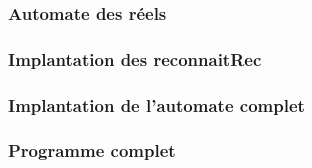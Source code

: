 \documentclass[./standalone.tex]{subfiles}
\begin{document}
\subsubsection{Automate des réels}


\subsubsection{Implantation des reconnaitRec}


\subsubsection{Implantation de l'automate complet}


\subsubsection{Programme complet}



%
%
%
%
%
%
%
%
%
%
%
%
%
%
\end{document}
